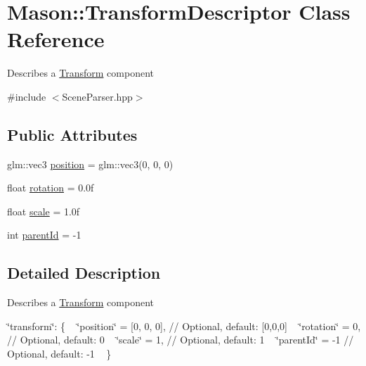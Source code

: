 \hypertarget{class_mason_1_1_transform_descriptor}{}\section{Mason\+:\+:Transform\+Descriptor Class Reference}
\label{class_mason_1_1_transform_descriptor}


Describes a \hyperlink{class_mason_1_1_transform}{Transform} component ~\newline
  




{\ttfamily \#include $<$Scene\+Parser.\+hpp$>$}

\subsection*{Public Attributes}
\begin{DoxyCompactItemize}
\item 
glm\+::vec3 \hyperlink{class_mason_1_1_transform_descriptor_acce622c3f89ae5b081c61feabc1319bf}{position} = glm\+::vec3(0, 0, 0)
\item 
float \hyperlink{class_mason_1_1_transform_descriptor_aae276979ce993523996db1c9192d8cf8}{rotation} = 0.\+0f
\item 
float \hyperlink{class_mason_1_1_transform_descriptor_a8fe9d0ecd10d501dc956fae07b252dc8}{scale} = 1.\+0f
\item 
int \hyperlink{class_mason_1_1_transform_descriptor_ae83bf1f16969979cb24e2ae9d1eb3134}{parent\+Id} = -\/1
\end{DoxyCompactItemize}


\subsection{Detailed Description}
Describes a \hyperlink{class_mason_1_1_transform}{Transform} component ~\newline
 

\char`\"{}transform\char`\"{}\+: \{ ~\newline
 \char`\"{}position\char`\"{} = \mbox{[}0, 0, 0\mbox{]}, // Optional, default\+: \mbox{[}0,0,0\mbox{]} ~\newline
 \char`\"{}rotation\char`\"{} = 0, // Optional, default\+: 0 ~\newline
 \char`\"{}scale\char`\"{} = 1, // Optional, default\+: 1 ~\newline
 \char`\"{}parent\+Id\char`\"{} = -\/1 // Optional, default\+: -\/1 ~\newline
 \} 

